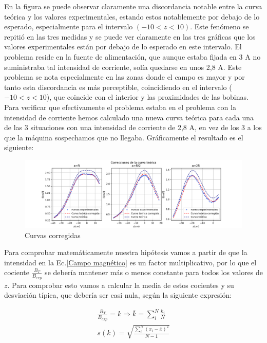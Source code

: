 \documentclass[a4paper,12pt,titlepage]{report}
\begin{document}
En la figura se puede observar claramente una discordancia notable entre la curva teórica y los valores experimentales, estando estos notablemente por debajo de lo esperado, especialmente para el intervalo $(-10<z<10)$. Este fenómeno se repitió en las tres medidas y se puede ver claramente en las tres gráficas que los valores experimentales están por debajo de lo esperado en este intervalo. El problema reside en la fuente de alimentación, que aunque estaba fijada en 3 A no suministraba tal intensidad de corriente, solía quedarse en unos 2,8 A. Este problema se nota especialmente en las zonas donde el campo es mayor y por tanto esta discordancia es más perceptible, coincidiendo en el intervalo ($-10<z<10$), que coincide con el interior y las proximidades de las bobinas. Para verificar que efectivamente el problema estaba en el problema con la intensidad de corriente hemos calculado una nueva curva teórica para cada una de las 3 situaciones con una intensidad de corriente de 2,8 A, en vez de los 3 a los que la máquina sospechamos que no llegaba. Gráficamente el resultado es el siguiente:

\begin{figure}[h!]
    \centering
    \includegraphics[width=1.20\linewidth]{Images/CurvasCorregidas.png}
    \caption{Curvas corregidas}
    \label{Curvas corregidas}
\end{figure}

Para comprobar matemáticamente nuestra hipótesis vamos a partir de que la intensidad en la Ec.\ref{Campo magnético} es un factor multiplicativo, por lo que el cociente $\frac{B_{T}}{B_{exp}}$ se debería mantener más o menos constante para todos los valores de $z$. Para comprobar esto vamos a calcular la media de estos cocientes y su desviación típica, que debería ser casi nula, según la siguiente expresión:

\begin{equation}
    \begin{gathered}
    \frac{B_{T}}{B_{exp}} = k \Rightarrow \overline{k} = \sum_i^{N} \frac{k_i}{N} \\
    s(k) = \sqrt{\frac{\sum_i^N (x_i-\overline{x})^2}{N-1}}
    \end{gathered}
\end{equation}
\end{document}
